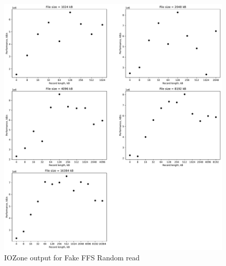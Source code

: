 \begin{figure}[!htb]
	\label{fig:app_bench_fffs_rnd_read}
	\begin{center}
		\includegraphics[width=1.0\textwidth]{figures/benchmarking/fake-ffs/Random read.pdf}
	\end{center}
	\caption{IOZone output for Fake FFS Random read}
\end{figure}

